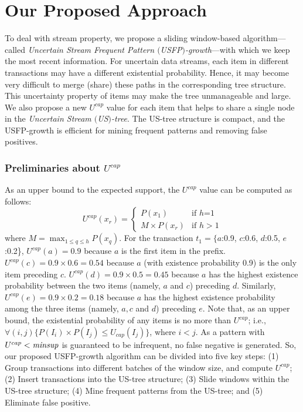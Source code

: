 \documentclass[10pt, conference, compsocconf]{IEEEtran}
\begin{document}
\section{Our Proposed Approach}\label{proposedWork}

To deal with stream property, we propose a sliding window-based algorithm---called {\em Uncertain Stream Frequent Pattern $($USFP$)$-growth}---with which we keep the most recent information. For uncertain data streams, each item in different transactions may have a different existential probability. Hence, it may become very difficult to merge (share) these paths in the corresponding tree structure. This uncertainty property of items may make the tree unmanageable and large. We also propose a new $U^{cap}$ value for each item that helps to share a single node in the {\em Uncertain Stream $($US$)$-tree}.  The US-tree structure is compact, and the USFP-growth is efficient for mining frequent patterns and removing false positives.

\subsubsection{Preliminaries about $U^{cap}$}

As an upper bound to the expected support, the $U^{cap}$ value can be computed as follows:
    \begin{equation}\label{equation:cap}
	U^{cap}(x_r) = \left\{
	\begin{array}{ll}
		P(x_1) & \mbox{if $h$=1}\\
		M \times P(x_r) & \mbox{if $h$$>$1}
	\end{array}\right.
\end{equation}
where $M=\max_{1\leq q\leq h} P(x_q)$.
For the transaction $t_1 = \{a$:0.9, $c$:0.6, $d$:0.5, $e$:0.2\}, 
$U^{cap}(a) = 0.9$ because $a$ is the first item in the prefix. 
$U^{cap}(c) = 0.9 \times 0.6 = 0.54$ because $a$ (with existence probability 0.9) is the only item preceding $c$. 
$U^{cap}(d) = 0.9 \times 0.5 = 0.45$ because $a$ has the highest existence probability between the two items (namely, $a$ and $c$) preceding $d$.
Similarly, $U^{cap}(e) = 0.9 \times 0.2 = 0.18$ because $a$ has the highest existence probability among the three items (namely, $a, c$ and $d$) preceding $e$.
Note that, as an upper bound, the existential probability of any items is no more than $U^{cap}$; i.e., $\forall(i,j) \{P(I_i) \times P(I_j)\leq U_{cap}(I_j)\}$, where $i < j$.
As a pattern with $U^{cap} < {\it minsup}$ is guaranteed to be infrequent, no false negative is generated.
So, our proposed USFP-growth algorithm can be divided into five key steps:
(1) Group transactions into different batches of the window size, and compute $U^{cap}$;
(2) Insert transactions into the US-tree structure;
(3) Slide windows within the US-tree structure;
(4) Mine frequent patterns from the US-tree; and
(5) Eliminate false positive.
\end{document}
